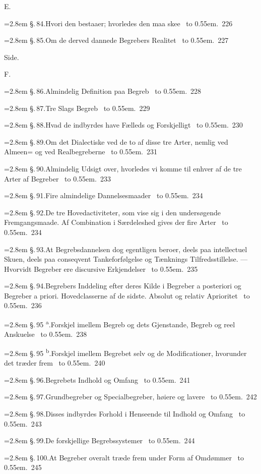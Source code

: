 \documentclass[12pt]{book}
\def\textit#1{#1}%
\def\\{ }%
\newcommand{\ovside}{\par\nopagebreak\hfill{\footnotesize Side.}\par\nobreak\vspace{0.2\baselineskip}}
\newcommand{\ovrubrik}[2]{%
  \par\vspace{0.9\baselineskip}%
  \begin{center}{\textit{#1}\par}\vspace{0.25\baselineskip}{#2\par}\end{center}
  \vspace{0.4\baselineskip}}
\newcommand{\ovline}[3]{%
  \par\vspace{0.25\baselineskip}%
  \noindent\hangindent=2.8em\hangafter=1
  \textit{\S.\,#1.}\quad #2%
  \nobreak\ \leaders\hbox to 0.55em{\hss.\hss}\hfill\ \textit{#3}\par}
\begin{document}
\ovrubrik{E.}{Begrebers synthetiske Combination.}
\ovline{84}{Hvori den bestaaer; hvorledes den maa skee}{226}
\ovline{85}{Om de derved dannede Begrebers Realitet}{227}

\ovside
\ovrubrik{F.}{Om Begreber i Almindelighed.\\
  (Resultater af det Foregaaende.)}
\ovline{86}{Almindelig Definition paa Begreb}{228}
\ovline{87}{Tre Slags Begreb}{229}
\ovline{88}{Hvad de indbyrdes have Fælleds og Forskjelligt}{230}
\ovline{89}{Om det Dialectiske ved de to af disse tre Arter, nemlig ved
  Almeen= og ved Realbegreberne}{231}
\ovline{90}{Almindelig Udsigt over, hvorledes vi komme til enhver af de tre
  Arter af Begreber}{233}
\ovline{91}{Fire almindelige Dannelsesmaader}{234}
\ovline{92}{De tre Hovedactiviteter, som vise sig i den undersøgende
  Fremgangsmaade. Af Combination i Særdeleshed gives der fire Arter}{234}
\ovline{93}{At Begrebsdannelsen dog egentligen beroer, deels paa intellectuel
  Skuen, deels paa conseqvent Tankeforfølgelse og Tænknings Tilfredsstillelse.
  --- Hvorvidt Begreber ere discursive Erkjendelser}{235}
\ovline{94}{Begrebers Inddeling efter deres Kilde i Begreber
  \textit{a posteriori} og Begreber \textit{a priori}. Hovedclasserne af de
  sidste. Absolut og relativ Aprioritet}{236}
\ovline{95 \textsuperscript{a}}{Forskjel imellem Begreb og dets Gjenstande,
  Begreb og reel Anskuelse}{238}
\ovline{95 \textsuperscript{b}}{Forskjel imellem Begrebet selv og de
  Modificationer, hvorunder det træder frem}{240}
\ovline{96}{Begrebets Indhold og Omfang}{241}
\ovline{97}{Grundbegreber og Specialbegreber, høiere og lavere}{242}
\ovline{98}{Disses indbyrdes Forhold i Henseende til Indhold og Omfang}{243}
\ovline{99}{De forskjellige Begrebssystemer}{244}
\ovline{100}{At Begreber overalt træde frem under Form af Omdømmer}{245}
\end{document}
